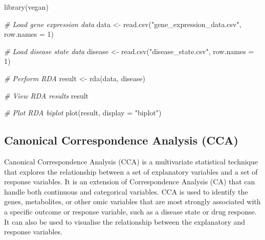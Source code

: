 \documentclass[
]{book}
\newenvironment{Shaded}{\begin{snugshade}}{\end{snugshade}}
\newcommand{\AttributeTok}[1]{\textcolor[rgb]{0.77,0.63,0.00}{#1}}
\newcommand{\CommentTok}[1]{\textcolor[rgb]{0.56,0.35,0.01}{\textit{#1}}}
\newcommand{\DecValTok}[1]{\textcolor[rgb]{0.00,0.00,0.81}{#1}}
\newcommand{\FunctionTok}[1]{\textcolor[rgb]{0.00,0.00,0.00}{#1}}
\newcommand{\NormalTok}[1]{#1}
\newcommand{\OtherTok}[1]{\textcolor[rgb]{0.56,0.35,0.01}{#1}}
\newcommand{\StringTok}[1]{\textcolor[rgb]{0.31,0.60,0.02}{#1}}
\begin{document}
\begin{Shaded}
\begin{Highlighting}[]
\FunctionTok{library}\NormalTok{(vegan)}

\CommentTok{\# Load gene expression data}
\NormalTok{data }\OtherTok{\textless{}{-}} \FunctionTok{read.csv}\NormalTok{(}\StringTok{"gene\_expression\_data.csv"}\NormalTok{, }\AttributeTok{row.names =} \DecValTok{1}\NormalTok{)}

\CommentTok{\# Load disease state data}
\NormalTok{disease }\OtherTok{\textless{}{-}} \FunctionTok{read.csv}\NormalTok{(}\StringTok{"disease\_state.csv"}\NormalTok{, }\AttributeTok{row.names =} \DecValTok{1}\NormalTok{)}

\CommentTok{\# Perform RDA}
\NormalTok{result }\OtherTok{\textless{}{-}} \FunctionTok{rda}\NormalTok{(data, disease)}

\CommentTok{\# View RDA results}
\NormalTok{result}

\CommentTok{\# Plot RDA biplot}
\FunctionTok{plot}\NormalTok{(result, }\AttributeTok{display =} \StringTok{"biplot"}\NormalTok{)}
\end{Highlighting}
\end{Shaded}

\normalsize

\hypertarget{canonical-correspondence-analysis}{%
\subsection{Canonical Correspondence Analysis (CCA)}\label{canonical-correspondence-analysis}}

Canonical Correspondence Analysis (CCA) is a multivariate statistical technique that explores the relationship between a set of explanatory variables and a set of response variables. It is an extension of Correspondence Analysis (CA) that can handle both continuous and categorical variables. CCA is used to identify the genes, metabolites, or other omic variables that are most strongly associated with a specific outcome or response variable, such as a disease state or drug response. It can also be used to visualise the relationship between the explanatory and response variables.

\small
\end{document}
